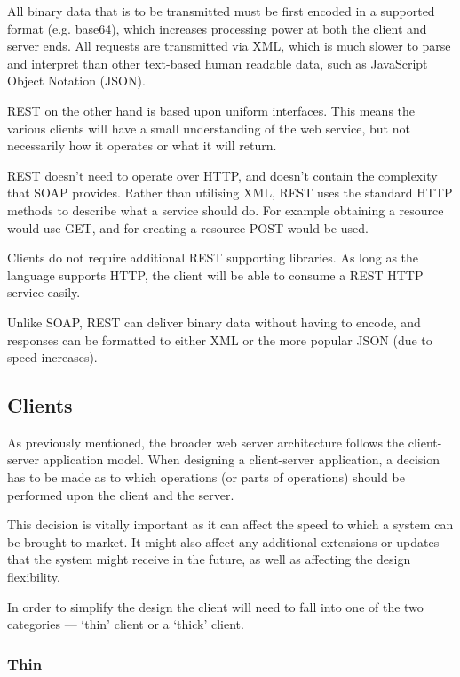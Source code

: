 All binary data that is to be transmitted must be first encoded in a supported
format (e.g. base64), which increases processing power at both the client and
server ends. All requests are transmitted via XML, which is much slower to
parse and interpret than other text-based human readable data, such as 
JavaScript Object Notation (JSON).

REST on the other hand is based upon uniform interfaces. This means the various
clients will have a small understanding of the web service, but not necessarily
how it operates or what it will return.

REST doesn't need to operate over HTTP, and doesn't contain the complexity that
SOAP provides. Rather than utilising XML, REST uses the standard HTTP methods
to describe what a service should do. For example obtaining a resource would
use GET, and for creating a resource POST would be used.

Clients do not require additional REST supporting libraries. As long as the
language supports HTTP, the client will be able to consume a REST HTTP service
easily.

Unlike SOAP, REST can deliver binary data without having to encode, and
responses can be formatted to either XML or the more popular JSON (due to speed
increases). 


\subsection{Clients}

As previously mentioned, the broader web server architecture follows the 
client-server application model. When designing a client-server application, a
decision has to be made as to which operations (or parts of operations) should
be performed upon the client and the server.

This decision is vitally important as it can affect the speed to which a system
can be brought to market. It might also affect any additional extensions or
updates that the system might receive in the future, as well as affecting the
design flexibility.

In order to simplify the design the client will need to fall into one of the
two categories --- `thin' client or a `thick' client. 


\subsubsection{Thin}

